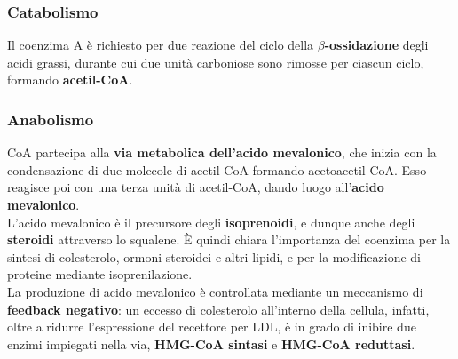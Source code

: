\documentclass[a4paper, 12pt]{article}
\begin{document}
\subsubsection{Catabolismo}
Il coenzima A è richiesto per due reazione del ciclo della \textbf{$\beta$-ossidazione} degli acidi grassi, durante cui due unità carboniose sono rimosse per ciascun ciclo, formando \textbf{acetil-CoA}.
\subsubsection{Anabolismo}
CoA partecipa alla \textbf{via metabolica dell'acido mevalonico}, che inizia con la condensazione di due molecole di acetil-CoA formando acetoacetil-CoA. Esso reagisce poi con una terza unità di acetil-CoA, dando luogo all'\textbf{acido mevalonico}.\\
L'acido mevalonico è il precursore degli \textbf{isoprenoidi}, e dunque anche degli \textbf{steroidi} attraverso lo squalene.
È quindi chiara l'importanza del coenzima per la sintesi di colesterolo, ormoni steroidei e altri lipidi, e per la modificazione di proteine mediante isoprenilazione. \\
La produzione di acido mevalonico è controllata mediante un meccanismo di \textbf{feedback negativo}: un eccesso di colesterolo all'interno della cellula, infatti, oltre a ridurre l'espressione del recettore per LDL, è in grado di inibire due enzimi impiegati nella via, \textbf{HMG-CoA sintasi} e \textbf{HMG-CoA reduttasi}.

\begin{center}
\end{center}
\end{document}
